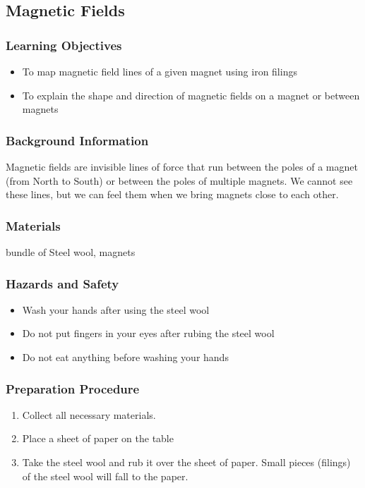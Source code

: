 \subsection{Magnetic Fields}

\subsubsection*{Learning Objectives}
\begin{itemize}
\item{To map magnetic field lines of a given magnet using iron filings}
\item{To explain the shape and direction of magnetic fields on a magnet or between magnets}
\end{itemize}

\subsubsection*{Background Information}
Magnetic fields are invisible lines of force that run between the poles of a magnet (from North to South) or between the poles of multiple magnets.  We cannot see these lines, but we can feel them when we bring magnets close to each other.

\subsubsection*{Materials}
bundle of Steel wool, magnets

\subsubsection*{Hazards and Safety}
\begin{itemize}
\item{Wash your hands after using the steel wool}
\item{Do not put fingers in your eyes after rubing the steel wool}
\item{Do not eat anything before washing your hands}
\end{itemize}

\subsubsection*{Preparation Procedure}
\begin{enumerate}
\item{Collect all necessary materials.}
\item{Place a sheet of paper on the table}
\item{Take the steel wool and rub it over the sheet of paper.  Small pieces (filings) of the steel wool will fall to the paper.}
\end{enumerate}

